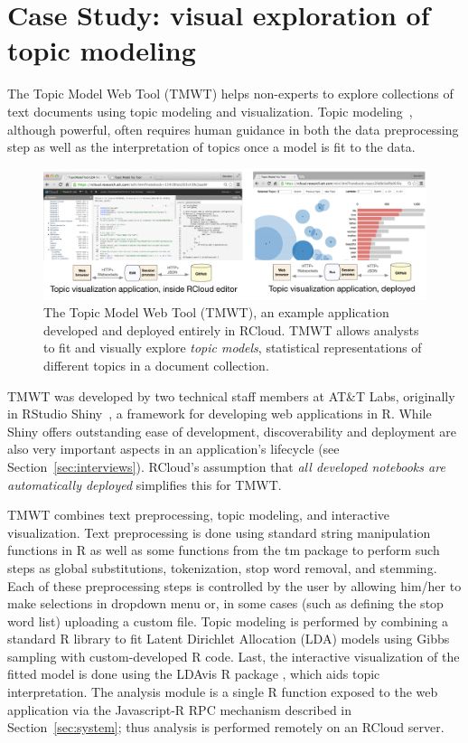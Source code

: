 \section{Case Study\label{sec:casestudy}: visual exploration of topic modeling}

The Topic Model Web Tool (TMWT) helps non-experts to explore collections of
text documents using topic modeling and
visualization. Topic modeling~\cite{Blei:2003:LDA},
although powerful, often requires human guidance in both the 
data preprocessing step as well as the
interpretation of topics once a model is fit to the data.

\begin{figure}
  \centering
  \includegraphics[width=.85\linewidth]{fig/casestudytext/casestudytext.pdf}
  \vspace{-1em}
  \caption{\small \label{fig:textvis}The Topic Model Web Tool (TMWT), an example application developed
    and deployed entirely in RCloud.  TMWT allows analysts to
    fit and visually explore \emph{topic models}, statistical
    representations of different topics in a document collection.
  }
  \vspace{-1.5em}
\end{figure}

TMWT was developed by two technical staff members at
AT\&T Labs, originally in RStudio Shiny~\cite{RStudio:2013:SWA},
a framework for developing web applications in R.
While Shiny offers outstanding ease of development,
discoverability and deployment are also very important aspects
in an application's lifecycle (see Section~\ref{sec:interviews}).
RCloud's assumption that \emph{all developed notebooks are automatically
deployed} simplifies this for TMWT.

TMWT combines text preprocessing, topic modeling, and
interactive visualization. Text preprocessing is done
using standard string manipulation functions in R as well as
some functions from the tm package \cite{R:tm} to perform
such steps as global substitutions, tokenization, stop word removal, 
and stemming. Each of these preprocessing steps is controlled by the user
by allowing him/her to make selections in dropdown menu or, in 
some cases (such as defining the stop word list) uploading 
a custom file. Topic modeling is performed by
combining a standard R library to fit Latent Dirichlet 
Allocation (LDA) models using
Gibbs sampling with custom-developed R code. Last, the interactive
visualization of the fitted model is done using the LDAvis R package
\cite{R:LDAvis}, which aids topic interpretation.
The analysis module is a single R function
exposed to the web application via the Javascript-R RPC
mechanism described in Section~\ref{sec:system};
thus analysis is performed remotely on an RCloud server.

